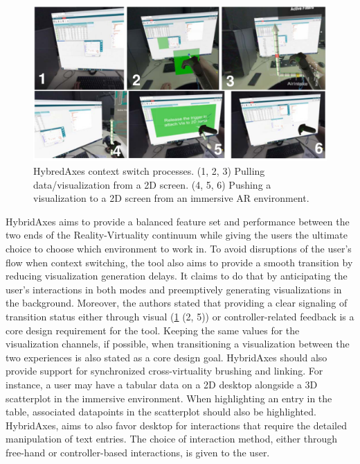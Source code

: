 \documentclass{vgtc}                          %
\begin{document}
\begin{figure}[tb]
	\centering
	\includegraphics[width=\columnwidth]{hybridaxes}
	\caption[Caption for RagRug]{HybredAxes context switch processes. (1, 2, 3)
		Pulling data/visualization from a 2D screen. (4, 5, 6) Pushing a
		visualization to a 2D screen from an immersive AR environment.}
	\label{fig:hybridaxes}
\end{figure}

\noindent HybridAxes aims to provide a balanced feature set and performance
between the two ends of the Reality-Virtuality continuum while giving the users
the ultimate choice to choose which environment to work in. To avoid
disruptions of the user's flow when context switching, the tool also aims to
provide a smooth transition by reducing visualization generation delays. It
claims to do that by anticipating the user's interactions in both modes and
preemptively generating
visualizations in the background. Moreover, the authors stated that providing
a clear signaling of transition status either through visual (\cref{fig:hybridaxes} (2, 5)) or
controller-related feedback is a core design requirement for the tool.
Keeping the same values for the visualization channels, if possible, when
transitioning a visualization between the two experiences is also stated as
a core design goal. HybridAxes should also provide support for synchronized
cross-virtuality brushing and linking. For instance, a user may have a tabular
data on a 2D desktop alongside a 3D scatterplot in the immersive environment.
When highlighting an entry in the table, associated datapoints in the
scatterplot should also be highlighted. HybridAxes, aims to also favor desktop
for interactions that require the detailed manipulation of text entries. The
choice of interaction method, either through free-hand or
controller-based interactions, is given to the user.
\end{document}

